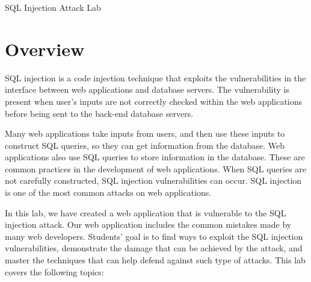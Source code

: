 





\newcommand{\sqlFigs}{./Figs}





\begin{center}
{\LARGE SQL Injection Attack Lab }
\end{center}



\section{Overview}

SQL injection is a code injection technique that exploits the 
vulnerabilities in the interface between web applications and 
database servers. The vulnerability is present when user's inputs 
are not correctly checked within the web applications 
before being sent to the back-end database servers.

Many web applications take inputs from users, and then use these
inputs to construct SQL queries, so they can get information from the database.
Web applications also use SQL queries to store information in
the database. These are common practices in the development of web applications.
When SQL queries are not carefully constructed, 
SQL injection vulnerabilities can occur. 
SQL injection is one of the most common 
attacks on web applications.


In this lab, we have created a web application that is vulnerable to the SQL injection attack. 
Our web application includes the common mistakes made by many web developers. 
Students' goal is to find ways to exploit the SQL injection vulnerabilities,
demonstrate the damage that can be achieved by the attack, 
and master the techniques that can help defend against such type of attacks.
This lab covers the following topics:

